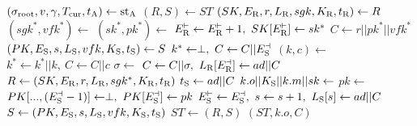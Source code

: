 \algrenewcommand\textproc{}
\algrenewcommand{}

\begin{minipage}{1.2\linewidth}
  {\fontsize{8}{10}\selectfont%
    \begin{multicols}{2}
  \begin{algorithmic}[1]
    \State $(\sigma_\text{root},v,\gamma,T_\text{cur},t_\text{A}) \gets \text{st}_\text{A}$
    \State $(R,S) \gets ST$
    \State $(SK,E_\text{R},r,L_\text{R},sgk,K_\text{R},t_\text{R}) \gets R$
    \State $(sgk^*,vfk^*) \gets$ 
    \State $(sk^*,pk^*) \gets$ 
    \State $E_\t{R}^\vdash \gets E_\t{R}^\vdash+1, \ SK[E_\t{R}^\vdash] \gets sk^*$
    \State $C \gets r || pk^* || vfk^*$
    \State $(PK,E_\text{S},s,L_\text{S},vfk,K_\text{S},t_\text{S}) \gets S$
    \State $k^* \gets \perp, \ C \gets C || E_\text{S}^\dashv$
    \State $(k,c) \gets$ 
    \State $k^* \gets k^* || k, \ C \gets C || c$ 
    \EndFor
    \State $\sigma \gets$ 
    \State $C \gets C || \sigma, \ L_\t{R}[E_\t{R}^\dashv] \gets ad||C$
    \State $R \gets (SK,E_\text{R},r,L_\text{R},sgk^*,K_\text{R},t_\text{R})$
    \State $t_\text{S} \gets ad||C$
    \State $k.o || K_\text{S} || k.m || sk \gets$ 
    \State $pk \gets$ 
    \State $PK[...,(E_\t{S}^\dashv -1)] \gets \perp, \ PK[E_\t{S}^\dashv] \gets pk$
    \State $E_\text{S}^\vdash \gets E_\text{S}^\dashv, \ s \gets s+1, \ L_\text{S}[s] \gets ad||C$
    \State $S \gets (PK,E_\text{S},s,L_\text{S},vfk,K_\text{S},t_\text{S})$
    \State $ST \gets (R,S)$
    \State \Return $(ST,k.o,C)$
    \EndProcedure
  \end{algorithmic}
\end{multicols}
  }
\end{minipage}
